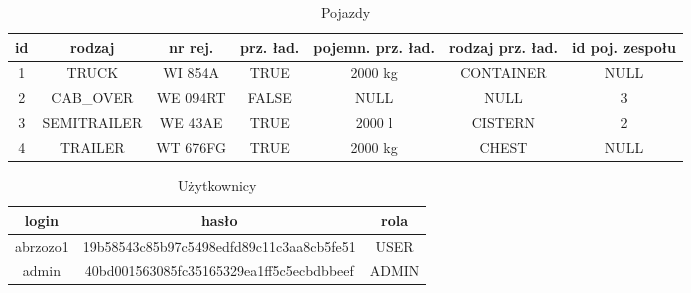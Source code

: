 \begin{table}[h]
    \centering
    \begin{tabular}{ |c|c|c|c|c|c|c| }
        \hline
        id & rodzaj & nr rej. & prz. ład. & pojemn. prz. ład. & rodzaj prz. ład. & id poj. zespołu \\ \hline
        1 & TRUCK & WI 854A & TRUE & 2000 \si{\kilogram} & CONTAINER & NULL \\ \hline
        2 & CAB{\_}OVER & WE 094RT & FALSE & NULL & NULL & 3 \\ \hline
        3 & SEMITRAILER& WE 43AE & TRUE & 2000 \si{\litre} & CISTERN & 2 \\ \hline
        4 & TRAILER & WT 676FG & TRUE & 2000 \si{\kilogram} & CHEST & NULL \\ \hline
    \end{tabular}
    \caption {Pojazdy}
\end{table}

\begin{table}[h]
    \centering
    \begin{tabular}{ |c|c|c| }
        \hline
        login & hasło & rola \\ \hline
        abrzozo1 & 19b58543c85b97c5498edfd89c11c3aa8cb5fe51 & USER \\ \hline
        admin & 40bd001563085fc35165329ea1ff5c5ecbdbbeef & ADMIN \\ \hline
    \end{tabular}
    \caption {Użytkownicy}
\end{table}
